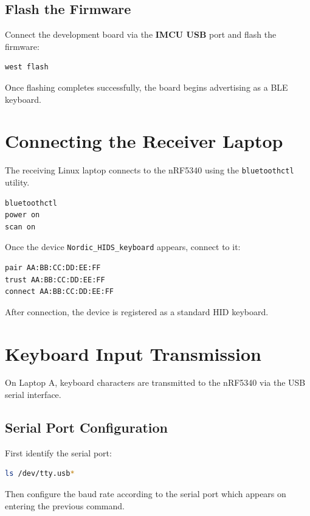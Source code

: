 \documentclass[conference]{IEEEtran}
\begin{document}
\subsection{Flash the Firmware}

Connect the development board via the \textbf{IMCU USB} port and flash the firmware:

\begin{lstlisting}[language=bash]
west flash
\end{lstlisting}

Once flashing completes successfully, the board begins advertising as a BLE keyboard.

\section{Connecting the Receiver Laptop}

The receiving Linux laptop connects to the nRF5340 using the \texttt{bluetoothctl} utility.

\begin{lstlisting}[language=bash]
bluetoothctl
power on
scan on
\end{lstlisting}

Once the device \texttt{Nordic\_HIDS\_keyboard} appears, connect to it:

\begin{lstlisting}[language=bash]
pair AA:BB:CC:DD:EE:FF
trust AA:BB:CC:DD:EE:FF
connect AA:BB:CC:DD:EE:FF
\end{lstlisting}

After connection, the device is registered as a standard HID keyboard.

\section{Keyboard Input Transmission}

On Laptop A, keyboard characters are transmitted to the nRF5340 via the USB serial interface.

\subsection{Serial Port Configuration}

First identify the serial port:

\begin{lstlisting}[language=bash]
ls /dev/tty.usb*
\end{lstlisting}

Then configure the baud rate according to the serial port which appears on entering the previous command.
\end{document}
